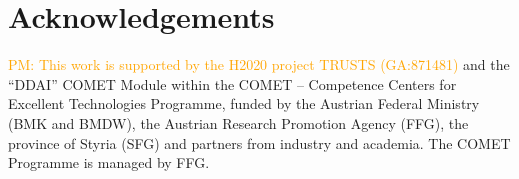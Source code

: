 \documentclass[manuscript,review,anonymous]{acmart}
\newcommand{\pmu}[1]{
        \textcolor{orange}{PM: #1}}
\begin{document}
\section{Acknowledgements}
\pmu{This work is supported by the H2020 project TRUSTS (GA:871481)} and the ``DDAI'' COMET Module within the COMET – Competence Centers for Excellent Technologies Programme, funded by the Austrian Federal Ministry (BMK and BMDW), the Austrian Research Promotion Agency (FFG), the province of Styria (SFG) and partners from industry and academia. The COMET Programme is managed by FFG.







\end{document}
